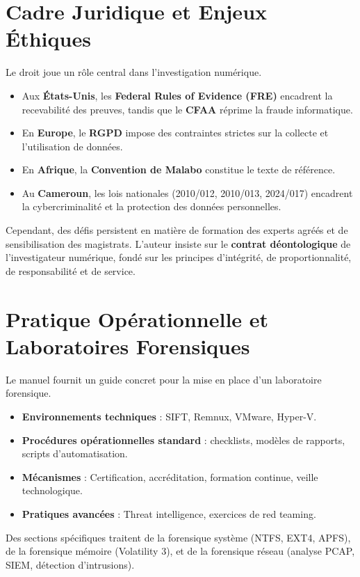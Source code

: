 \documentclass[12pt,a4paper]{article}
\begin{document}
\section{\centering \huge Cadre Juridique et Enjeux Éthiques}
{\Large Le droit joue un rôle central dans l’investigation numérique.
\begin{itemize}
	\item Aux \textbf{États-Unis}, les \textbf{Federal Rules of Evidence (FRE)} encadrent la recevabilité des preuves, tandis que le \textbf{CFAA} réprime la fraude informatique.
	\item En \textbf{Europe}, le \textbf{RGPD} impose des contraintes strictes sur la collecte et l’utilisation de données.
	\item En \textbf{Afrique}, la \textbf{Convention de Malabo} constitue le texte de référence.
	\item Au \textbf{Cameroun}, les lois nationales (2010/012, 2010/013, 2024/017) encadrent la cybercriminalité et la protection des données personnelles.
\end{itemize}
Cependant, des défis persistent en matière de formation des experts agréés et de sensibilisation des magistrats. L’auteur insiste sur le \textbf{contrat déontologique} de l’investigateur numérique, fondé sur les principes d’intégrité, de proportionnalité, de responsabilité et de service.}

\section{\centering \huge Pratique Opérationnelle et Laboratoires Forensiques}
{\Large Le manuel fournit un guide concret pour la mise en place d’un laboratoire forensique.
\begin{itemize}
	\item \textbf{Environnements techniques} : SIFT, Remnux, VMware, Hyper-V.
	\item \textbf{Procédures opérationnelles standard} : checklists, modèles de rapports, scripts d’automatisation.
	\item \textbf{Mécanismes} : Certification, accréditation, formation continue, veille technologique.
	\item \textbf{Pratiques avancées} : Threat intelligence, exercices de red teaming.
\end{itemize}
Des sections spécifiques traitent de la forensique système (NTFS, EXT4, APFS), de la forensique mémoire (Volatility 3), et de la forensique réseau (analyse PCAP, SIEM, détection d’intrusions).}
\end{document}
